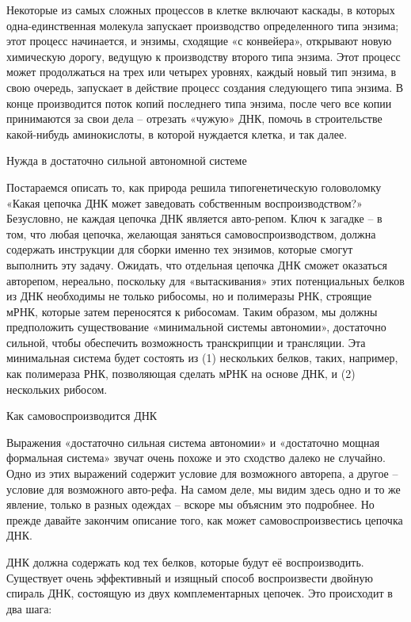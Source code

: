 \documentclass[../main.tex]{subfiles}
\begin{document}
Некоторые из самых сложных процессов в клетке включают каскады, в которых одна-единственная молекула запускает производство определенного типа энзима; этот процесс начинается, и энзимы, сходящие «с конвейера», открывают новую химическую дорогу, ведущую к производству второго типа энзима. Этот процесс может продолжаться на трех или четырех уровнях, каждый новый тип энзима, в свою очередь, запускает в действие процесс создания следующего типа энзима. В конце производится поток копий последнего типа энзима, после чего все копии принимаются за свои дела \--- отрезать «чужую» ДНК, помочь в строительстве какой-нибудь аминокислоты, в которой нуждается клетка, и так далее.

Нужда в достаточно сильной автономной системе

Постараемся описать то, как природа решила типогенетическую головоломку «Какая цепочка ДНК может заведовать собственным воспроизводством?» Безусловно, не каждая цепочка ДНК является авто-репом. Ключ к загадке \--- в том, что любая цепочка, желающая заняться самовоспроизводством, должна содержать инструкции для сборки именно тех энзимов, которые смогут выполнить эту задачу. Ожидать, что отдельная цепочка ДНК сможет оказаться авторепом, нереально, поскольку для «вытаскивания» этих потенциальных белков из ДНК необходимы не только рибосомы, но и полимеразы РНК, строящие мРНК, которые затем переносятся к рибосомам. Таким образом, мы должны предположить существование «минимальной системы автономии», достаточно сильной, чтобы обеспечить возможность транскрипции и трансляции. Эта минимальная система будет состоять из (1) нескольких белков, таких, например, как полимераза РНК, позволяющая сделать мРНК на основе ДНК, и (2) нескольких рибосом.

Как самовоспроизводится ДНК

Выражения «достаточно сильная система автономии» и «достаточно мощная формальная система» звучат очень похоже и это сходство далеко не случайно. Одно из этих выражений содержит условие для возможного авторепа, а другое \--- условие для возможного авто-рефа. На самом деле, мы видим здесь одно и то же явление, только в разных одеждах \--- вскоре мы объясним это подробнее. Но прежде давайте закончим описание того, как может самовоспроизвестись цепочка ДНК.

ДНК должна содержать код тех белков, которые будут её воспроизводить. Существует очень эффективный и изящный способ воспроизвести двойную спираль ДНК, состоящую из двух комплементарных цепочек. Это происходит в два шага:
\end{document}
